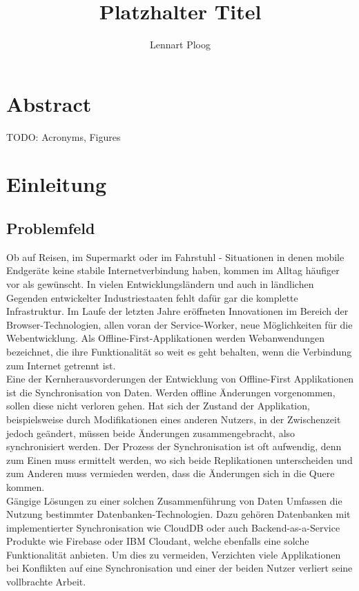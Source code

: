 \documentclass[a4paper, 12pt]{scrreprt}
\title{Platzhalter Titel}
\subtitle{}
\author{Lennart Ploog}
\begin{document}
	\maketitle
	\newpage
	\tableofcontents
	\newpage
\chapter{Abstract}
TODO: Acronyms, Figures
\chapter{Einleitung}
\section{Problemfeld}
Ob auf Reisen, im Supermarkt oder im Fahrstuhl - Situationen in denen mobile Endgeräte keine stabile Internetverbindung haben, kommen im Alltag häufiger vor als gewünscht. In vielen Entwicklungsländern und auch in ländlichen Gegenden entwickelter Industriestaaten fehlt dafür gar die komplette Infrastruktur. Im Laufe der letzten Jahre eröffneten Innovationen im Bereich der Browser-Technologien, allen voran der Service-Worker, neue Möglichkeiten für die Webentwicklung. Als Offline-First-Applikationen werden Webanwendungen bezeichnet, die ihre Funktionalität so weit es geht behalten, wenn die Verbindung zum Internet getrennt ist.\\

Eine der Kernherausvorderungen der Entwicklung von Offline-First Applikationen ist die Synchronisation von Daten. Werden offline Änderungen vorgenommen, sollen diese nicht verloren gehen. Hat sich der Zustand der Applikation, beispielsweise durch Modifikationen eines anderen Nutzers, in der Zwischenzeit jedoch geändert, müssen beide Änderungen zusammengebracht, also synchronisiert werden. Der Prozess der Synchronisation ist oft aufwendig, denn zum Einen muss ermittelt werden, wo sich beide Replikationen unterscheiden und zum Anderen muss vermieden werden, dass die Änderungen sich in die Quere kommen.\\ 

Gängige Lösungen zu einer solchen Zusammenführung von Daten Umfassen die Nutzung bestimmter Datenbanken-Technologien. Dazu gehören Datenbanken mit implementierter Synchronisation wie CloudDB oder auch Backend-as-a-Service Produkte wie Firebase oder IBM Cloudant, welche ebenfalls eine solche Funktionalität anbieten. Um dies zu vermeiden, Verzichten viele Applikationen bei Konflikten auf eine Synchronisation und einer der beiden Nutzer verliert seine vollbrachte Arbeit.
\end{document}
